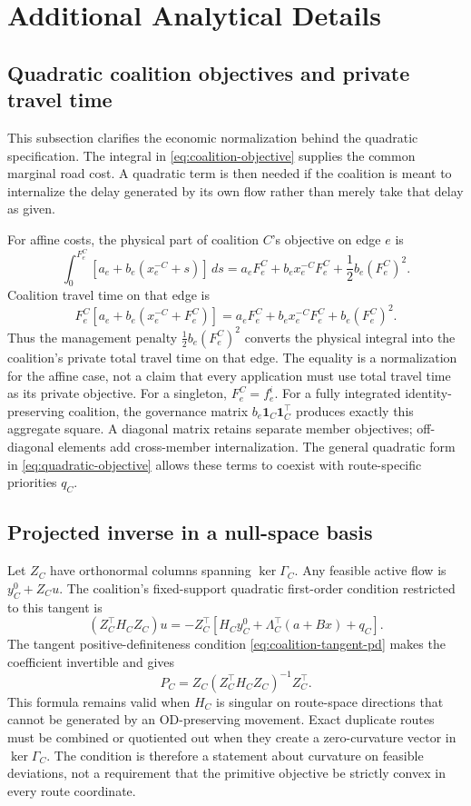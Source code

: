 \appendix

\section{Additional Analytical Details}\label{app:analysis}

\subsection{Quadratic coalition objectives and private travel time}

This subsection clarifies the economic normalization behind the quadratic specification. The integral in \eqref{eq:coalition-objective} supplies the common marginal road cost. A quadratic term is then needed if the coalition is meant to internalize the delay generated by its own flow rather than merely take that delay as given.

For affine costs, the physical part of coalition $C$'s objective on edge $e$ is
\[
 \int_0^{F_e^C}[a_e+b_e(x_e^{-C}+s)]\,ds
 =a_eF_e^C+b_ex_e^{-C}F_e^C+\frac12b_e(F_e^C)^2.
\]
Coalition travel time on that edge is
\[
 F_e^C[a_e+b_e(x_e^{-C}+F_e^C)]
 =a_eF_e^C+b_ex_e^{-C}F_e^C+b_e(F_e^C)^2.
\]
Thus the management penalty $\frac12b_e(F_e^C)^2$ converts the physical integral into the coalition's private total travel time on that edge. The equality is a normalization for the affine case, not a claim that every application must use total travel time as its private objective. For a singleton, $F_e^C=f_e^i$. For a fully integrated identity-preserving coalition, the governance matrix $b_e\mathbf 1_C\mathbf 1_C^\top$ produces exactly this aggregate square. A diagonal matrix retains separate member objectives; off-diagonal elements add cross-member internalization. The general quadratic form in \eqref{eq:quadratic-objective} allows these terms to coexist with route-specific priorities $q_C$.

\subsection{Projected inverse in a null-space basis}

Let $Z_C$ have orthonormal columns spanning $\ker\Gamma_C$. Any feasible active flow is $y_C^0+Z_Cu$. The coalition's fixed-support quadratic first-order condition restricted to this tangent is
\[
 (Z_C^\top H_CZ_C)u
 =-Z_C^\top[H_Cy_C^0+\Lambda_C^\top(a+Bx)+q_C].
\]
The tangent positive-definiteness condition \eqref{eq:coalition-tangent-pd} makes the coefficient invertible and gives
\[
 P_C=Z_C(Z_C^\top H_CZ_C)^{-1}Z_C^\top.
\]
This formula remains valid when $H_C$ is singular on route-space directions that cannot be generated by an OD-preserving movement. Exact duplicate routes must be combined or quotiented out when they create a zero-curvature vector in $\ker\Gamma_C$. The condition is therefore a statement about curvature on feasible deviations, not a requirement that the primitive objective be strictly convex in every route coordinate.

